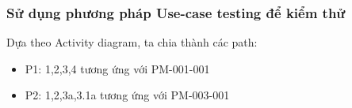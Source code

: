 \subsubsection{Sử dụng phương pháp Use-case testing để kiểm thử}
Dựa theo Activity diagram, ta chia thành các path:
\begin{itemize}
    \item P1: 1,2,3,4 tương ứng với PM-001-001
    \item P2: 1,2,3a,3.1a tương ứng với PM-003-001
\end{itemize}
\newpage